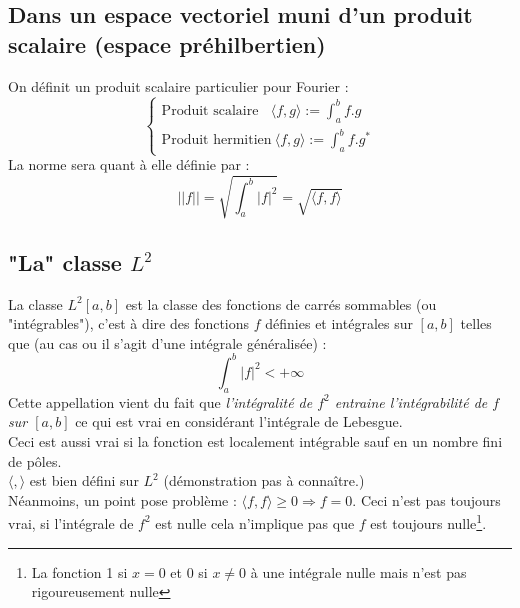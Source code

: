 \documentclass[11pt, a4paper, openany]{book}
\begin{document}
		\subsection{Dans un espace vectoriel muni d'un produit scalaire (espace préhilbertien)}
		On définit un produit scalaire particulier pour Fourier :
		\begin{equation}
			\left\{\begin{array}{l}
			\text{Produit scalaire}\ \ \ \ \langle f,g \rangle := \int_a^b f.g\\
			\text{Produit hermitien} \ \langle f,g \rangle := \int_a^b f.g^*
			\end{array}\right.
		\end{equation}
		La norme sera quant à elle définie par : 
		\begin{equation}
			||f|| = \sqrt{\int_a^b |f|^2} = \sqrt{\langle f,f\rangle}
		\end{equation}
		\subsection{"La" classe $L^2$}
		La classe $L^2[a,b]$ est la classe des fonctions de carrés sommables (ou "intégrables"), c'est à dire des fonctions $f$ définies et intégrales sur $[a,b]$ telles que (au cas ou il s'agit d'une intégrale généralisée) :
		\begin{equation}
			\int_a^b |f|^2 < +\infty
		\end{equation}
		Cette appellation vient du fait que \textit{l'intégralité de $f^2$ entraine l'intégrabilité de $f$ sur $[a,b]$} ce qui est vrai en considérant l'intégrale de Lebesgue.\\
		Ceci est aussi vrai si la fonction est localement intégrable sauf en un nombre fini de pôles.\\
									
		$\langle , \rangle$ est bien défini sur $L^2$ (démonstration pas à connaître.)\\
		Néanmoins, un point pose problème : $\langle f,f \rangle \geq 0 \Rightarrow f = 0$. Ceci n'est pas toujours vrai, si l'intégrale de $f^2$ est nulle cela n'implique pas que $f$ est toujours nulle\footnote{La fonction 1 si $x=0$ et 0 si $x\neq 0$ à une intégrale nulle mais n'est pas rigoureusement nulle}.\\
									
\end{document}
